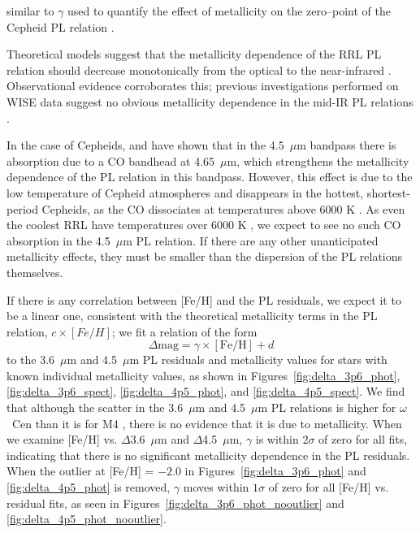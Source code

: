 \documentclass[a4paper,fleqn,usenatbib]{mnras}
\begin{document}
similar to $\gamma$ used to quantify the effect of metallicity on the zero--point of the Cepheid PL relation \citep{1998ApJ...498..181K}. 

Theoretical models suggest that the metallicity dependence of the RRL PL relation should decrease monotonically from the optical to the near-infrared \citep{2001MNRAS.326.1183B, 2004ApJS..154..633C}. Observational evidence corroborates this; previous investigations performed on WISE data suggest no obvious metallicity dependence in the mid-IR PL relations \citep{2013ApJ...776..135M}.

In the case of Cepheids, \citet{2011ApJ...743...76S} and \citet{2015arXiv150206995S} have shown that in the 4.5~$\mu$m bandpass there is absorption due to a CO bandhead at 4.65~$\mu$m, which strengthens the metallicity dependence of the PL relation in this bandpass. However, this effect is due to the low temperature of Cepheid atmospheres and disappears in the hottest, shortest-period Cepheids, as the CO dissociates at temperatures above 6000 K \citep{2012ApJ...759..146M}. As even the coolest RRL have temperatures over 6000 K \citep{1971PASP...83..697I}, we expect to see no such CO absorption in the 4.5~$\mu$m PL relation. If there are any other unanticipated metallicity effects, they must be smaller than the dispersion of the PL relations themselves.

If there is any correlation between [Fe/H] and the PL residuals, we expect it to be a linear one, consistent with the theoretical metallicity terms in the PL relation, $c\times[Fe/H]$; we fit a relation of the form
\begin{equation}
\Delta\text{mag} = \gamma \times[\text{Fe/H}] + d
\end{equation}
to the 3.6~$\mu$m and 4.5~$\mu$m PL residuals and metallicity values for stars with known individual metallicity values, as shown in Figures~\ref{fig:delta_3p6_phot}, \ref{fig:delta_3p6_spect}, \ref{fig:delta_4p5_phot}, and \ref{fig:delta_4p5_spect}. We find that although the scatter in the 3.6~$\mu$m and 4.5~$\mu$m PL relations is higher for $\omega$~Cen than it is for M4 \citep{2015arXiv150507858N, 2015ApJ...799..165B}, there is no evidence that it is due to metallicity. When we examine [Fe/H] vs. $\Delta$3.6~$\mu$m and $\Delta$4.5~$\mu$m, $\gamma$ is within $2\sigma$ of zero for all fits, indicating that there is no significant metallicity dependence in the PL residuals. When the outlier at [Fe/H] = $-2.0$ in Figures~\ref{fig:delta_3p6_phot} and \ref{fig:delta_4p5_phot} is removed, $\gamma$ moves within $1\sigma$ of zero for all [Fe/H] vs. residual fits, as seen in Figures~\ref{fig:delta_3p6_phot_nooutlier} and \ref{fig:delta_4p5_phot_nooutlier}.
\end{document}

